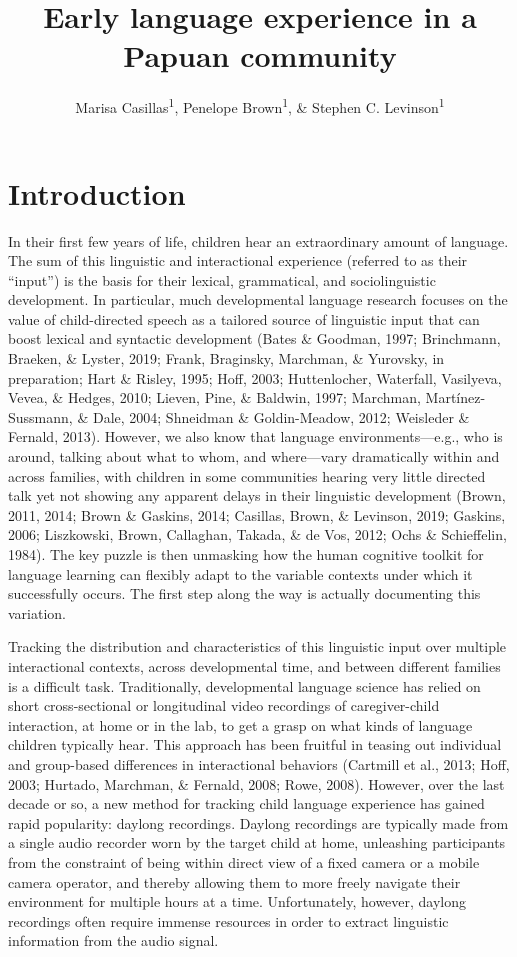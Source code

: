 \documentclass[,man,mask,floatsintext]{apa6}
\title{Early language experience in a Papuan community}
\author{Marisa Casillas\textsuperscript{1}, Penelope Brown\textsuperscript{1},
\& Stephen C. Levinson\textsuperscript{1}}
\date{}
\affiliation{
\vspace{0.5cm}
\textsuperscript{1} Max Planck Institute for Psycholinguistics}
\begin{document}
\maketitle

\section{Introduction}\label{intro}

In their first few years of life, children hear an extraordinary amount
of language. The sum of this linguistic and interactional experience
(referred to as their \enquote{input}) is the basis for their lexical,
grammatical, and sociolinguistic development. In particular, much
developmental language research focuses on the value of child-directed
speech as a tailored source of linguistic input that can boost lexical
and syntactic development (Bates \& Goodman, 1997; Brinchmann, Braeken,
\& Lyster, 2019; Frank, Braginsky, Marchman, \& Yurovsky, in
preparation; Hart \& Risley, 1995; Hoff, 2003; Huttenlocher, Waterfall,
Vasilyeva, Vevea, \& Hedges, 2010; Lieven, Pine, \& Baldwin, 1997;
Marchman, Martínez-Sussmann, \& Dale, 2004; Shneidman \& Goldin-Meadow,
2012; Weisleder \& Fernald, 2013). However, we also know that language
environments---e.g., who is around, talking about what to whom, and
where---vary dramatically within and across families, with children in
some communities hearing very little directed talk yet not showing any
apparent delays in their linguistic development (Brown, 2011, 2014;
Brown \& Gaskins, 2014; Casillas, Brown, \& Levinson, 2019; Gaskins,
2006; Liszkowski, Brown, Callaghan, Takada, \& de Vos, 2012; Ochs \&
Schieffelin, 1984). The key puzzle is then unmasking how the human
cognitive toolkit for language learning can flexibly adapt to the
variable contexts under which it successfully occurs. The first step
along the way is actually documenting this variation.

Tracking the distribution and characteristics of this linguistic input
over multiple interactional contexts, across developmental time, and
between different families is a difficult task. Traditionally,
developmental language science has relied on short cross-sectional or
longitudinal video recordings of caregiver-child interaction, at home or
in the lab, to get a grasp on what kinds of language children typically
hear. This approach has been fruitful in teasing out individual and
group-based differences in interactional behaviors (Cartmill et al.,
2013; Hoff, 2003; Hurtado, Marchman, \& Fernald, 2008; Rowe, 2008).
However, over the last decade or so, a new method for tracking child
language experience has gained rapid popularity: daylong recordings.
Daylong recordings are typically made from a single audio recorder worn
by the target child at home, unleashing participants from the constraint
of being within direct view of a fixed camera or a mobile camera
operator, and thereby allowing them to more freely navigate their
environment for multiple hours at a time. Unfortunately, however,
daylong recordings often require immense resources in order to extract
linguistic information from the audio signal.
\end{document}
